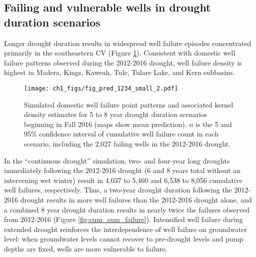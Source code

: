 \subsection{Failing and vulnerable wells in drought duration scenarios}

Longer drought duration results in widespread well failure episodes concentrated primarily in the southeastern CV (Figure \ref{fig:p_1_2_3_4}). Consistent with domestic well failure patterns observed during the 2012-2016 drought, well failure density is highest in Madera, Kings, Kaweah, Tule, Tulare Lake, and Kern subbasins.  

\begin{figure}%
	\texttt{[image: ch1\_figs/fig\_pred\_1234\_small\_2.pdf]}
	\caption{Simulated domestic well failure point patterns and associated kernel density estimates for 5 to 8 year drought duration scenarios beginning in Fall 2016 (maps show mean prediction). $n$ is the 5 and 95\% confidence interval of cumulative well failure count in each scenario, including the 2,027 failing wells in the 2012-2016 drought.}
	\label{fig:p_1_2_3_4}
\end{figure}

In the ``continuous drought'' simulation, two- and four-year long droughts immediately following the 2012-2016 drought (6 and 8 years total without an intervening wet winter) result in 4,037 to 5,460 and 6,538 to 8,056 cumulative well failures, respectively. Thus, a two-year drought duration following the 2012-2016 drought results in more well failures than the 2012-2016 drought alone, and a combined 8 year drought duration results in nearly twice the failures observed from 2012-2016 (Figure \ref{fig:cum_sum_failure}). Intensified well failure during extended drought reinforces the interdependence of well failure on groundwater level: when groundwater levels cannot recover to pre-drought levels and pump depths are fixed, wells are more vulnerable to failure.  

